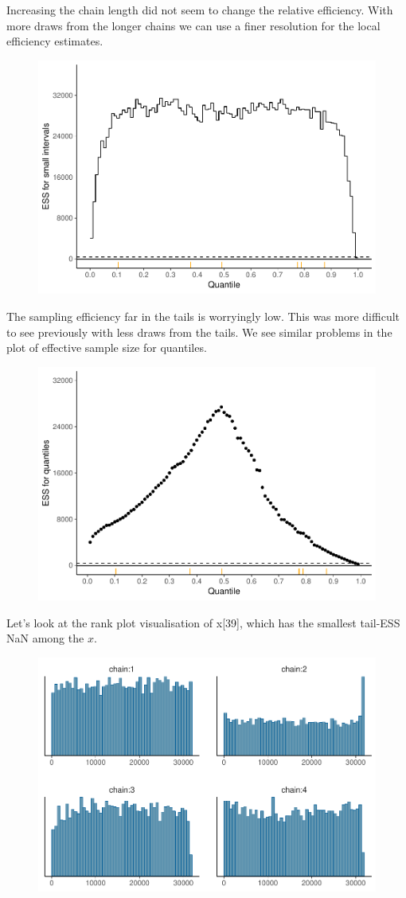 \documentclass[american,]{article}
\begin{document}
Increasing the chain length did not seem to change the relative
efficiency. With more draws from the longer chains we can use a finer
resolution for the local efficiency estimates.

\begin{figure}[tp]
  \centering
  \includegraphics[width=0.6\linewidth]{graphics/local-ess-fit-nom-td20l-finer-1.pdf}
\end{figure}

The sampling efficiency far in the tails is worryingly low. This was
more difficult to see previously with less draws from the tails. We see
similar problems in the plot of effective sample size for quantiles.

\begin{figure}[tp]
  \centering
  \includegraphics[width=0.6\linewidth]{graphics/quantile-ess-fit-nom-td20l-finer-1.pdf}
\end{figure}

Let's look at the rank plot visualisation of x{[}39{]}, which has the
smallest tail-ESS NaN among the \(x\).

\begin{figure}[tp]
  \centering
  \includegraphics[width=0.6\linewidth]{graphics/hist-fit-nom-td20l-1.pdf}
\end{figure}
\end{document}
